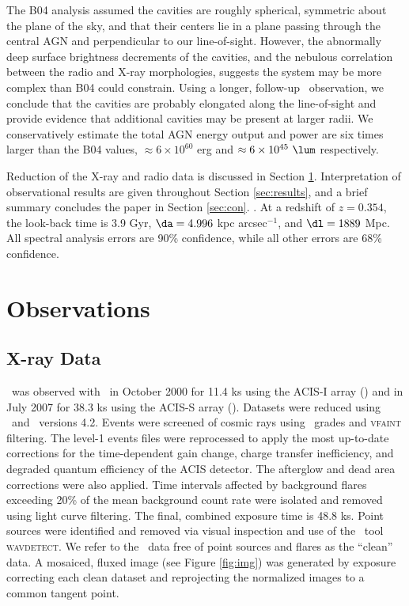 \documentclass[apjpt4]{aastex}
\begin{document}
The B04 analysis assumed the cavities are roughly spherical, symmetric
about the plane of the sky, and that their centers lie in a plane
passing through the central AGN and perpendicular to our
line-of-sight. However, the abnormally deep surface brightness
decrements of the cavities, and the nebulous correlation between the
radio and X-ray morphologies, suggests the system may be more complex
than B04 could constrain. Using a longer, follow-up \cxo\ observation,
we conclude that the cavities are probably elongated along the
line-of-sight and provide evidence that additional cavities may be
present at larger radii. We conservatively estimate the total AGN
energy output and power are six times larger than the B04 values,
$\approx 6 \times 10^{60}$ erg and $\approx 6 \times 10^{45} ~\lum$
respectively.

Reduction of the X-ray and radio data is discussed in Section
\ref{sec:obs}. Interpretation of observational results are given
throughout Section \ref{sec:results}, and a brief summary concludes
the paper in Section \ref{sec:con}. \LCDM. At a redshift of $z =
0.354$, the look-back time is 3.9 Gyr, $\da = 4.996$ kpc
arcsec$^{-1}$, and $\dl = 1889$ Mpc. All spectral analysis errors are
90\% confidence, while all other errors are 68\% confidence.

\section{Observations}
\label{sec:obs}

\subsection{X-ray Data}
\label{sec:xray}

\rbs\ was observed with \cxo\ in October 2000 for 11.4 ks using the
ACIS-I array () and in
July 2007 for 38.3 ks using the ACIS-S array (). Datasets were reduced using
\ciao\ and \caldb\ versions 4.2. Events were screened of cosmic rays
using \asca\ grades and {\textsc{vfaint}} filtering. The level-1
events files were reprocessed to apply the most up-to-date corrections
for the time-dependent gain change, charge transfer inefficiency, and
degraded quantum efficiency of the ACIS detector. The afterglow and
dead area corrections were also applied. Time intervals affected by
background flares exceeding 20\% of the mean background count rate
were isolated and removed using light curve filtering. The final,
combined exposure time is 48.8 ks. Point sources were identified and
removed via visual inspection and use of the \ciao\ tool
{\textsc{wavdetect}}. We refer to the \cxo\ data free of point sources
and flares as the ``clean'' data. A mosaiced, fluxed image (see Figure
\ref{fig:img}) was generated by exposure correcting each clean dataset
and reprojecting the normalized images to a common tangent point.
\end{document}
